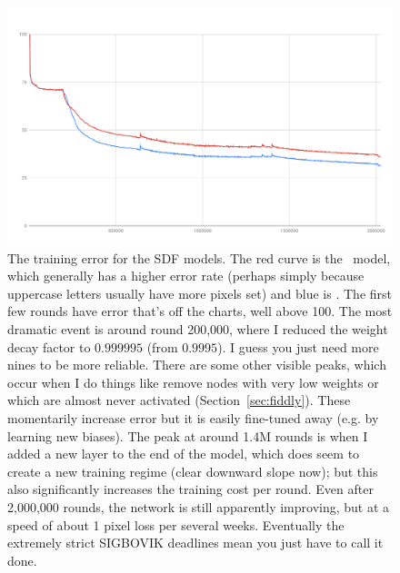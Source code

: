 \documentclass[twocolumn]{article}
\begin{document}
\begin{figure}[ht]
\centering
  \includegraphics[width=0.99 \linewidth]{sdfmergederror}
\caption{ The training error for the SDF models. The red curve is the
  \makeuppercase\ model, which generally has a higher error rate
  (perhaps simply because uppercase letters usually have more pixels
  set) and blue is \makelowercase. The first few rounds have error
  that's off the charts, well above 100. The most dramatic event is
  around round 200,000, where I reduced the weight decay factor to
  $0.999995$ (from $0.9995$). I guess you just need more nines to be
  more reliable. There are some other visible peaks, which occur when
  I do things like remove nodes with very low weights or which are
  almost never activated (Section~\ref{sec:fiddly}). These momentarily
  increase error but it is easily fine-tuned away (e.g. by learning
  new biases). The peak at around 1.4M rounds is when I added a new
  layer to the end of the model, which does seem to create a new
  training regime (clear downward slope now); but this also
  significantly increases the training cost per round. Even after
  2,000,000 rounds, the network is still apparently improving, but at
  a speed of about 1 pixel loss per several weeks. Eventually the
  extremely strict SIGBOVIK deadlines mean you just have to call it done.
} \label{fig:sdfmergederror}
\end{figure}
\end{document}
